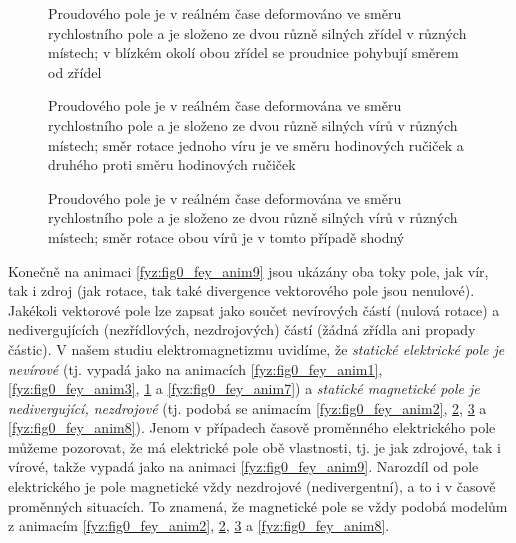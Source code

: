     \begin{figure}[ht!]
      \centering
      \caption{Proudového pole je v reálném čase deformováno ve směru rychlostního pole a je 
               složeno ze dvou různě silných zřídel v různých místech; v blízkém okolí obou zřídel 
               se proudnice pohybují směrem od zřídel}
      \label{fyz:fig0_fey_anim4}
    \end{figure} 

    \begin{figure}[ht!]
      \centering  
      \caption{Proudového pole je v reálném čase deformována ve směru rychlostního pole a je 
               složeno ze dvou různě silných vírů v různých místech; směr rotace jednoho víru je ve 
               směru hodinových ručiček a druhého proti směru hodinových ručiček}
      \label{fyz:fig0_fey_anim5}
    \end{figure} 

    \begin{figure}[ht!]
      \centering
      \caption{Proudového pole je v reálném čase deformována ve směru rychlostního pole a je  
               složeno ze dvou různě silných vírů v různých místech; směr rotace obou vírů je v 
               tomto případě shodný}
      \label{fyz:fig0_fey_anim6}
    \end{figure} 
    
    Konečně na animaci \ref{fyz:fig0_fey_anim9} jsou ukázány oba toky pole, jak vír, tak i zdroj 
    (jak rotace, tak také divergence vektorového pole jsou nenulové). Jakékoli vektorové pole lze 
    zapsat jako součet nevírových částí (nulová rotace) a nedivergujících (nezřídlových, 
    nezdrojových) částí (žádná zřídla ani propady částic). V našem studiu elektromagnetizmu 
    uvidíme, že\emph{ statické elektrické pole je nevírové} (tj. vypadá jako na animacích 
    \ref{fyz:fig0_fey_anim1}, \ref{fyz:fig0_fey_anim3}, \ref{fyz:fig0_fey_anim4} a 
    \ref{fyz:fig0_fey_anim7}) a \emph{statické magnetické pole je nedivergující, nezdrojové} (tj. 
    podobá se animacím \ref{fyz:fig0_fey_anim2}, \ref{fyz:fig0_fey_anim5}, \ref{fyz:fig0_fey_anim6} a 
    \ref{fyz:fig0_fey_anim8}). Jenom v případech časově proměnného elektrického pole můžeme 
    pozorovat, že má elektrické pole obě vlastnosti, tj. je jak zdrojové, tak i vírové, takže 
    vypadá jako na animaci \ref{fyz:fig0_fey_anim9}. Narozdíl od pole elektrického je pole 
    magnetické vždy nezdrojové (nedivergentní), a to i v časově proměnných situacích. To znamená, 
    že magnetické pole se vždy podobá modelům z animacím \ref{fyz:fig0_fey_anim2}, 
    \ref{fyz:fig0_fey_anim5}, \ref{fyz:fig0_fey_anim6} a \ref{fyz:fig0_fey_anim8}.              
    
